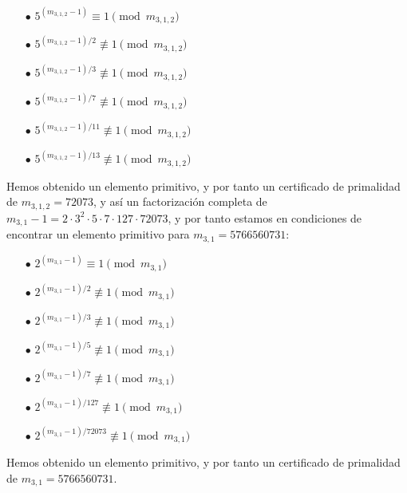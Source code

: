 \documentclass[fleqn]{article}
\begin{document}
    \begin{enumerate}
        \item[$\bullet$] $5^{(m_{3,1,2} - 1)} \equiv 1 \pmod{m_{3,1,2}}$
        \item[$\bullet$] $5^{(m_{3,1,2} - 1)/2} \not\equiv 1 \pmod{m_{3,1,2}}$    
        \item[$\bullet$] $5^{(m_{3,1,2} - 1)/3} \not\equiv 1 \pmod{m_{3,1,2}}$
        \item[$\bullet$] $5^{(m_{3,1,2} - 1)/7} \not\equiv 1 \pmod{m_{3,1,2}}$
        \item[$\bullet$] $5^{(m_{3,1,2} - 1)/11} \not\equiv 1 \pmod{m_{3,1,2}}$
        \item[$\bullet$] $5^{(m_{3,1,2} - 1)/13} \not\equiv 1 \pmod{m_{3,1,2}}$
    \end{enumerate}
    Hemos obtenido un elemento primitivo, y por tanto un certificado de primalidad de $m_{3,1,2} = 72073$, y así un factorización completa de 
    $m_{3,1} - 1 = 2 \cdot 3^2 \cdot 5 \cdot 7 \cdot 127 \cdot 72073$, y por tanto estamos en condiciones de encontrar un elemento primitivo para $m_{3,1} = 5766560731$:
    \begin{enumerate}
        \item[$\bullet$] $2^{(m_{3,1} - 1)} \equiv 1 \pmod{m_{3,1}}$
        \item[$\bullet$] $2^{(m_{3,1} - 1)/2} \not\equiv 1 \pmod{m_{3,1}}$    
        \item[$\bullet$] $2^{(m_{3,1} - 1)/3} \not\equiv 1 \pmod{m_{3,1}}$
        \item[$\bullet$] $2^{(m_{3,1} - 1)/5} \not\equiv 1 \pmod{m_{3,1}}$
        \item[$\bullet$] $2^{(m_{3,1} - 1)/7} \not\equiv 1 \pmod{m_{3,1}}$
        \item[$\bullet$] $2^{(m_{3,1} - 1)/127} \not\equiv 1 \pmod{m_{3,1}}$
        \item[$\bullet$] $2^{(m_{3,1} - 1)/72073} \not\equiv 1 \pmod{m_{3,1}}$
    \end{enumerate}
    Hemos obtenido un elemento primitivo, y por tanto un certificado de primalidad de $m_{3,1} = 5766560731$. 
    
\end{document}
